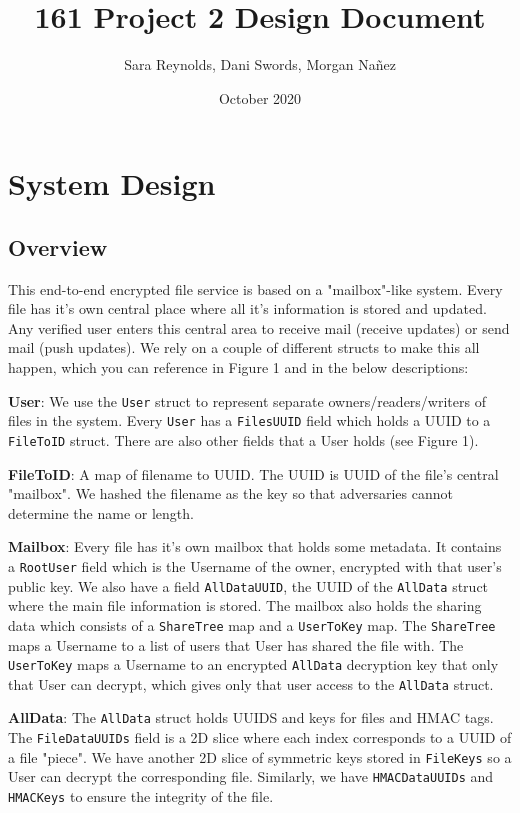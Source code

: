 \documentclass{article}
\title{161 Project 2 Design Document}
\author{Sara Reynolds, Dani Swords, Morgan Nañez}
\date{October 2020}
\begin{document}
\maketitle

\section{System Design}
    \subsection{Overview}
    This end-to-end encrypted file service is based on a "mailbox"-like system. Every file has it's own central place where all it's information is stored and updated.  Any verified user enters this central area to receive mail (receive updates) or send mail (push updates). We rely on a couple of different structs to make this all happen, which you can reference in Figure 1 and in the below descriptions:
    
\textbf{User}:
    We use the \texttt{User} struct to represent separate owners/readers/writers of files in the system. Every \texttt{User} has a \texttt{FilesUUID} field which holds a UUID to a \texttt{FileToID} struct. There are also other fields that a User holds (see Figure 1).

    \textbf{FileToID}:  A map of filename to UUID. The UUID is UUID of the file's central "mailbox". We hashed the filename as the key so that adversaries cannot determine the name or length.

    \textbf{Mailbox}: Every file has it's own mailbox that holds some metadata. It contains a \texttt{RootUser} field which is the Username of the owner, encrypted with that user's public key. We also have a field \texttt{AllDataUUID}, the UUID of the \texttt{AllData} struct where the main file information is stored. The mailbox also holds the sharing data which consists of a \texttt{ShareTree} map and a \texttt{UserToKey} map. The \texttt{ShareTree} maps a Username to a list of users that User has shared the file with. The \texttt{UserToKey} maps a Username to an encrypted \texttt{AllData} decryption key that only that User can decrypt, which gives only that user access to the \texttt{AllData} struct.
    
    \textbf{AllData}: The \texttt{AllData} struct holds UUIDS and keys for files and HMAC tags. The \texttt{FileDataUUIDs} field is a 2D slice where each index corresponds to a UUID of a file "piece". We have another 2D slice of symmetric keys stored in \texttt{FileKeys} so a User can decrypt the corresponding file. Similarly, we have \texttt{HMACDataUUIDs} and \texttt{HMACKeys} to ensure the integrity of the file.
\end{document}
